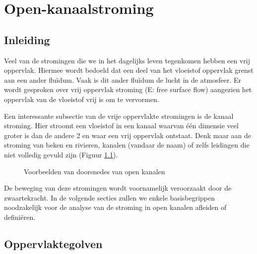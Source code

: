 \chapter{Open-kanaalstroming}
\label{sec:Kanaalstroming}

	\section{Inleiding}
	\label{sec:Kanaalstroming Inleiding}
Veel van de stromingen die we in het dagelijks leven tegenkomen hebben een vrij oppervlak. Hiermee wordt bedoeld dat een deel van het vloeistof oppervlak grenst aan een ander fluïdum. Vaak is dit ander fluïdum de lucht in de atmosfeer. Er wordt gesproken over vrij oppervlak stroming (E: free surface flow) aangezien het oppervlak van de vloeistof vrij is om te vervormen.

Een interessante subsectie van de vrije oppervlakte stromingen is de kanaal stroming. Hier stroomt een vloeistof in een kanaal waarvan één dimensie veel groter is dan de andere 2 en waar een vrij oppervlak ontstaat. Denk maar aan de stroming van beken en rivieren, kanalen (vandaar de naam) of zelfs leidingen die niet volledig gevuld zijn (Figuur \ref{fig:Open_kanaal_doorsnedes}). 
\begin{figure}[htb]
	\centering
	
	\caption{Voorbeelden van doorsnedes van open kanalen}
	\label{fig:Open_kanaal_doorsnedes}
\end{figure}

De beweging van deze stromingen wordt voornamelijk veroorzaakt door de zwaartekracht. In de volgende secties zullen we enkele basisbegrippen noodzakelijk voor de analyse van de stroming in open kanalen afleiden of definiëren.

	\section{Oppervlaktegolven}
	\label{sec:Oppervlaktegolven}
	
